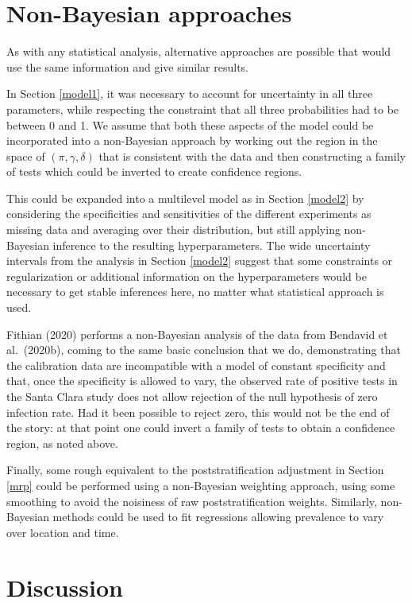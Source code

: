 \documentclass[11pt]{article}
\begin{document}
\section{Non-Bayesian approaches}\label{nonbayes}

As with any statistical analysis, alternative approaches are possible
that would use the same information and give similar results.

In Section \ref{model1}, it was necessary to account for uncertainty
in all three parameters, while respecting the constraint that all
three probabilities had to be between 0 and 1.  We assume that both
these aspects of the model could be incorporated into a non-Bayesian
approach by working out the region in the space of
$(\pi,\gamma,\delta)$ that is consistent with the data and then
constructing a family of tests which could be inverted to create
confidence regions.

This could be expanded into a multilevel model as in Section
\ref{model2} by considering the specificities and sensitivities of the
different experiments as missing data and averaging over their
distribution, but still applying non-Bayesian inference to the
resulting hyperparameters.  The wide uncertainty intervals from the
analysis in Section \ref{model2} suggest that some constraints or
regularization or additional information on the hyperparameters would
be necessary to get stable inferences here, no matter what statistical
approach is used.

Fithian (2020) performs a non-Bayesian analysis of the data from
Bendavid et al.\ (2020b), coming to the same basic conclusion that we
do, demonstrating that the calibration data are incompatible with a
model of constant specificity and that, once the specificity is
allowed to vary, the observed rate of positive tests in the Santa
Clara study does not allow rejection of the null hypothesis of zero
infection rate.  Had it been possible to reject zero, this would not
be the end of the story: at that point one could invert a family of
tests to obtain a confidence region, as noted above.

Finally, some rough equivalent to the poststratification adjustment in
Section \ref{mrp} could be performed using a non-Bayesian weighting
approach, using some smoothing to avoid the noisiness of raw
poststratification weights.  Similarly, non-Bayesian methods could be
used to fit regressions allowing prevalence to vary over location and
time.


\section{Discussion}
\end{document}
